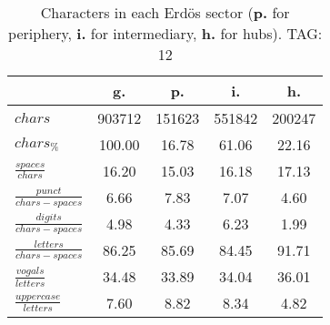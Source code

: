\begin{table}[h!]
\begin{center}
\begin{tabular}{| l | c | c | c | c |}\hline
 & g. & p. & i. & h. \\\hline
$chars$ & 903712  & 151623  & 551842  & 200247 \\\hline
$chars_{\%}$ & 100.00  & 16.78  & 61.06  & 22.16 \\\hline
$\frac{spaces}{chars}$ & 16.20  & 15.03  & 16.18  & 17.13 \\\hline
$\frac{punct}{chars-spaces}$ & 6.66  & 7.83  & 7.07  & 4.60 \\\hline
$\frac{digits}{chars-spaces}$ & 4.98  & 4.33  & 6.23  & 1.99 \\\hline
$\frac{letters}{chars-spaces}$ & 86.25  & 85.69  & 84.45  & 91.71 \\\hline
$\frac{vogals}{letters}$ & 34.48  & 33.89  & 34.04  & 36.01 \\\hline
$\frac{uppercase}{letters}$ & 7.60  & 8.82  & 8.34  & 4.82 \\\hline
\end{tabular}
\caption{Characters in each Erd\"os sector ({{\bf p.}} for periphery, {{\bf i.}} for intermediary, 
    {{\bf h.}} for hubs). TAG: 12}
\end{center}
\end{table}